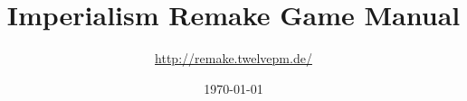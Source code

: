 \documentclass[a4paper]{report}
\begin{document}
\title{Imperialism Remake Game Manual}
\author{\url{http://remake.twelvepm.de/}}
\date{\today}
\maketitle
\end{document}
